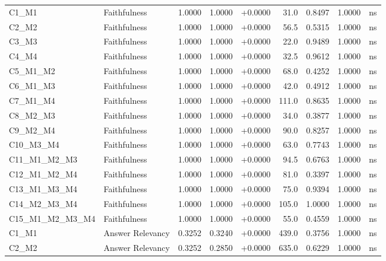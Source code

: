 \begin{table}[p]
\begin{tabular*}{\textwidth}{@{\extracolsep{\fill}} l l r r r r r r c @{}}
\addlinespace
C1\_M1          & Faithfulness         & 1.0000 & 1.0000 & +0.0000 & 31.0 & 0.8497 & 1.0000 & ns \\
\addlinespace
C2\_M2          & Faithfulness         & 1.0000 & 1.0000 & +0.0000 & 56.5 & 0.5315 & 1.0000 & ns \\
\addlinespace
C3\_M3          & Faithfulness         & 1.0000 & 1.0000 & +0.0000 & 22.0 & 0.9489 & 1.0000 & ns \\
\addlinespace
C4\_M4          & Faithfulness         & 1.0000 & 1.0000 & +0.0000 & 32.5 & 0.9612 & 1.0000 & ns \\
\addlinespace
C5\_M1\_M2      & Faithfulness         & 1.0000 & 1.0000 & +0.0000 & 68.0 & 0.4252 & 1.0000 & ns \\
\addlinespace
C6\_M1\_M3      & Faithfulness         & 1.0000 & 1.0000 & +0.0000 & 42.0 & 0.4912 & 1.0000 & ns \\
\addlinespace
C7\_M1\_M4      & Faithfulness         & 1.0000 & 1.0000 & +0.0000 & 111.0 & 0.8635 & 1.0000 & ns \\
\addlinespace
C8\_M2\_M3      & Faithfulness         & 1.0000 & 1.0000 & +0.0000 & 34.0 & 0.3877 & 1.0000 & ns \\
\addlinespace
C9\_M2\_M4      & Faithfulness         & 1.0000 & 1.0000 & +0.0000 & 90.0 & 0.8257 & 1.0000 & ns \\
\addlinespace
C10\_M3\_M4     & Faithfulness         & 1.0000 & 1.0000 & +0.0000 & 63.0 & 0.7743 & 1.0000 & ns \\
\addlinespace
C11\_M1\_M2\_M3 & Faithfulness         & 1.0000 & 1.0000 & +0.0000 & 94.5 & 0.6763 & 1.0000 & ns \\
\addlinespace
C12\_M1\_M2\_M4 & Faithfulness         & 1.0000 & 1.0000 & +0.0000 & 81.0 & 0.3397 & 1.0000 & ns \\
\addlinespace
C13\_M1\_M3\_M4 & Faithfulness         & 1.0000 & 1.0000 & +0.0000 & 75.0 & 0.9394 & 1.0000 & ns \\
\addlinespace
C14\_M2\_M3\_M4 & Faithfulness         & 1.0000 & 1.0000 & +0.0000 & 105.0 & 1.0000 & 1.0000 & ns \\
\addlinespace
C15\_M1\_M2\_M3\_M4 & Faithfulness         & 1.0000 & 1.0000 & +0.0000 & 55.0 & 0.4559 & 1.0000 & ns \\
\addlinespace
C1\_M1          & Answer Relevancy     & 0.3252 & 0.3240 & +0.0000 & 439.0 & 0.3756 & 1.0000 & ns \\
\addlinespace
C2\_M2          & Answer Relevancy     & 0.3252 & 0.2850 & +0.0000 & 635.0 & 0.6229 & 1.0000 & ns \\

\end{tabular*}
\end{table}

